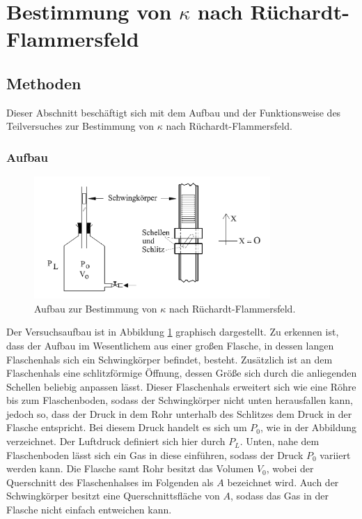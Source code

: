 \section{Bestimmung von $\kappa$ nach Rüchardt-Flammersfeld}
	
	\subsection{Methoden}
		
		Dieser Abschnitt beschäftigt sich mit dem Aufbau und der Funktionsweise des Teilversuches zur Bestimmung von $\kappa$ nach Rüchardt-Flammersfeld.
	
		\subsubsection{Aufbau}
		
			\begin{figure}[ht]
				\centering
				\includegraphics[width=0.8\textwidth]{bilder/aufbau_v1.png}
				\caption{Aufbau zur Bestimmung von $\kappa$ nach Rüchardt-Flammersfeld.\cite{WWU}}
				\label{fig:AufbauV1}	
			\end{figure}
			Der Versuchsaufbau ist in Abbildung \ref{fig:AufbauV1} graphisch dargestellt.
			Zu erkennen ist, dass der Aufbau im Wesentlichem aus einer großen Flasche, in dessen langen Flaschenhals sich ein Schwingkörper befindet, besteht.
			Zusätzlich ist an dem Flaschenhals eine schlitzförmige Öffnung, dessen Größe sich durch die anliegenden Schellen beliebig anpassen lässt.
			Dieser Flaschenhals erweitert sich wie eine Röhre bis zum Flaschenboden, sodass der Schwingkörper nicht unten herausfallen kann, jedoch so, dass der Druck in dem Rohr unterhalb des Schlitzes dem Druck in der Flasche entspricht.		
			Bei diesem Druck handelt es sich um $P_0$, wie in der Abbildung verzeichnet. 
			Der Luftdruck definiert sich hier durch $P_L$.
			Unten, nahe dem Flaschenboden lässt sich ein Gas in diese einführen, sodass der Druck $P_0$ variiert werden kann.
			Die Flasche samt Rohr besitzt das Volumen $V_0$, wobei der Querschnitt des Flaschenhalses im Folgenden als $A$ bezeichnet wird. 
			Auch der Schwingkörper besitzt eine Querschnittsfläche von $A$, sodass das Gas in der Flasche nicht einfach entweichen kann. 
			

